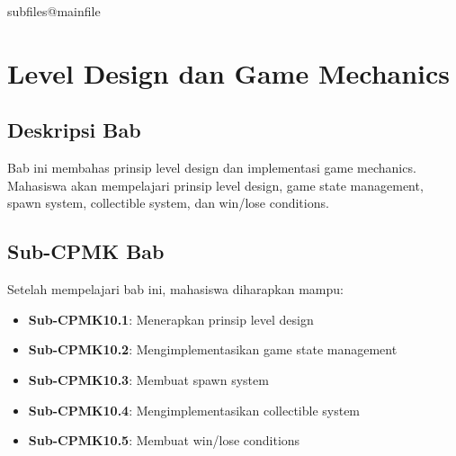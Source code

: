 \documentclass[../../main.tex]{subfiles}
\begin{document}
\ifcsname subfiles@mainfile\endcsname\else
    \setcounter{chapter}{9}
\fi
\chapter{Level Design dan Game Mechanics}

\section{Deskripsi Bab}

Bab ini membahas prinsip level design dan implementasi game mechanics. Mahasiswa akan mempelajari prinsip level design, game state management, spawn system, collectible system, dan win/lose conditions.

\section{Sub-CPMK Bab}

Setelah mempelajari bab ini, mahasiswa diharapkan mampu:
\begin{itemize}
\item \textbf{Sub-CPMK10.1}: Menerapkan prinsip level design
\item \textbf{Sub-CPMK10.2}: Mengimplementasikan game state management
\item \textbf{Sub-CPMK10.3}: Membuat spawn system
\item \textbf{Sub-CPMK10.4}: Mengimplementasikan collectible system
\item \textbf{Sub-CPMK10.5}: Membuat win/lose conditions
\end{itemize}









\end{document}
